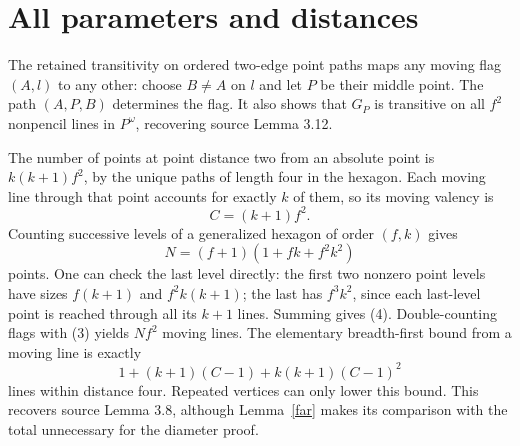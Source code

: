 \documentclass[11pt,a4paper]{article}
\begin{document}
\section{All parameters and distances}
The retained transitivity on ordered two-edge point paths maps any moving
flag $(A,l)$ to any other: choose $B\ne A$ on $l$ and let $P$ be their
middle point. The path $(A,P,B)$ determines the flag. It also shows that
$G_P$ is transitive on all $f^2$ nonpencil lines in $P^\omega$, recovering
source Lemma 3.12.

The number of points at point distance two from an absolute point is
$k(k+1)f^2$, by the unique paths of length four in the hexagon. Each moving
line through that point accounts for exactly $k$ of them, so its moving
valency is
\[
                              C=(k+1)f^2.                 \tag{3}
\]
Counting successive levels of a generalized hexagon of order $(f,k)$
gives
\[
             N=(f+1)(1+fk+f^2k^2)                         \tag{4}
\]
points. One can check the last level directly: the first two nonzero point
levels have sizes $f(k+1)$ and $f^2k(k+1)$; the last has $f^3k^2$, since
each last-level point is reached through all its $k+1$ lines. Summing gives
(4). Double-counting flags with (3) yields $Nf^2$ moving lines.
The elementary breadth-first bound from a moving line is exactly
\[
               1+(k+1)(C-1)+k(k+1)(C-1)^2                \tag{5}
\]
lines within distance four. Repeated vertices can only lower this bound.
This recovers source Lemma 3.8, although Lemma~\ref{far} makes its
comparison with the total unnecessary for the diameter proof.
\end{document}
